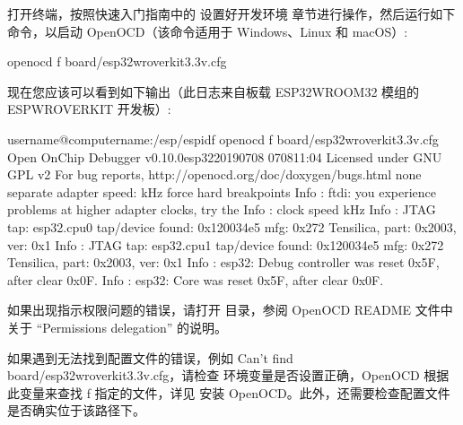 \documentclass[a4paper,12pt,english]{sphinxmanual}
\begin{document}
\sphinxAtStartPar
打开终端，按照快速入门指南中的 设置好开发环境 章节进行操作，然后运行如下命令，以启动 OpenOCD（该命令适用于 Windows、Linux 和 macOS）:

\begin{sphinxVerbatim}[commandchars=\\\{\}]
openocd \PYGZhy{}f board/esp32\PYGZhy{}wrover\PYGZhy{}kit\PYGZhy{}3.3v.cfg
\end{sphinxVerbatim}

\sphinxAtStartPar
现在您应该可以看到如下输出（此日志来自板载 ESP32\sphinxhyphen{}WROOM\sphinxhyphen{}32 模组的 ESP\sphinxhyphen{}WROVER\sphinxhyphen{}KIT 开发板）:

\begin{sphinxVerbatim}[commandchars=\\\{\}]
user\PYGZhy{}name@computer\PYGZhy{}name:\PYGZti{}/esp/esp\PYGZhy{}idf\PYGZdl{} openocd \PYGZhy{}f board/esp32\PYGZhy{}wrover\PYGZhy{}kit\PYGZhy{}3.3v.cfg
Open On\PYGZhy{}Chip Debugger  v0.10.0\PYGZhy{}esp32\PYGZhy{}20190708 \PYGZhy{}07\PYGZhy{}08\PYGZhy{}11:04
Licensed under GNU GPL v2
For bug reports, 
        http://openocd.org/doc/doxygen/bugs.html
none separate
adapter speed:  kHz
force hard breakpoints
Info : ftdi:  you experience problems at higher adapter clocks, try the  
Info : clock speed  kHz
Info : JTAG tap: esp32.cpu0 tap/device found: 0x120034e5 mfg: 0x272 Tensilica, part: 0x2003, ver: 0x1
Info : JTAG tap: esp32.cpu1 tap/device found: 0x120034e5 mfg: 0x272 Tensilica, part: 0x2003, ver: 0x1
Info : esp32: Debug controller was reset 0x5F, after clear 0x0F.
Info : esp32: Core was reset 0x5F, after clear 0x0F.
\end{sphinxVerbatim}

\sphinxAtStartPar
如果出现指示权限问题的错误，请打开  目录，参阅 OpenOCD README 文件中关于 “Permissions delegation” 的说明。

\sphinxAtStartPar
如果遇到无法找到配置文件的错误，例如 Can’t find board/esp32\sphinxhyphen{}wrover\sphinxhyphen{}kit\sphinxhyphen{}3.3v.cfg，请检查  环境变量是否设置正确，OpenOCD 根据此变量来查找 \sphinxhyphen{}f 指定的文件，详见 安装 OpenOCD。此外，还需要检查配置文件是否确实位于该路径下。
\end{document}
